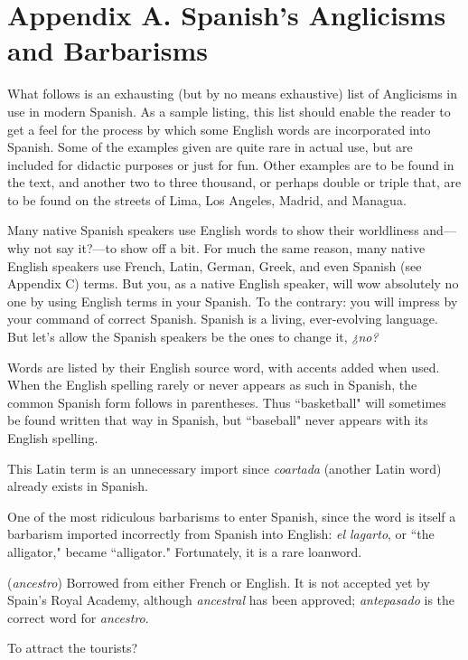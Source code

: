 \chapter{Appendix A. Spanish's Anglicisms and Barbarisms}
What follows is an exhausting (but by no means exhaustive)
list of Anglicisms in use in modern Spanish. As a sample listing, this
list should enable the reader to get a feel for the process by which
some English words are incorporated into Spanish. Some of the examples given are quite rare in actual use, but are included for didactic
purposes or just for fun. Other examples are to be found in the text,
and another two to three thousand, or perhaps double or triple that, are
to be found on the streets of Lima, Los Angeles, Madrid, and Managua.

Many native Spanish speakers use English words to show their
worldliness and---why not say it?---to show off a bit. For much the
same reason, many native English speakers use French, Latin, German,
Greek, and even Spanish (see Appendix C) terms. But you, as a native
English speaker, will wow absolutely no one by using English terms in
your Spanish. To the contrary: you will impress by your command of
correct Spanish. Spanish is a living, ever-evolving language. But let's
allow the Spanish speakers be the ones to change it, \emph{¿no?}

Words are listed by their English source word, with accents
added when used. When the English spelling rarely or never appears
as such in Spanish, the common Spanish form follows in parentheses.
Thus ``basketball" will sometimes be found written that way in Spanish, but ``baseball" never appears with its English spelling.

\bsk

 This Latin term is an unnecessary import since \emph{coartada} (another Latin word) already exists in Spanish.

 One of the most ridiculous barbarisms to enter
Spanish, since the word is itself a barbarism imported incorrectly from
Spanish into English: \emph{el lagarto}, or ``the alligator," became ``alligator."
Fortunately, it is a rare loanword.

 (\emph{ancestro}) Borrowed from either French or English.
It is not accepted yet by Spain's Royal Academy, although \emph{ancestral}
has been approved; \emph{antepasado} is the correct word for \emph{ancestro}.

 To attract the tourists?

